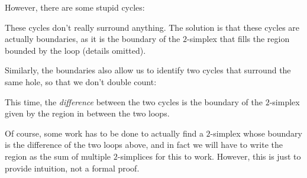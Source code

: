 \documentclass[a4paper]{article}
\begin{document}
\begin{eg}
  However, there are some stupid cycles:
  \begin{center}
  \end{center}
  These cycles don't really surround anything. The solution is that these cycles are actually boundaries, as it is the boundary of the $2$-simplex that fills the region bounded by the loop (details omitted).

  Similarly, the boundaries also allow us to identify two cycles that surround the same hole, so that we don't double count:
  \begin{center}
  \end{center}
  This time, the \emph{difference} between the two cycles is the boundary of the $2$-simplex given by the region in between the two loops.

  Of course, some work has to be done to actually find a $2$-simplex whose boundary is the difference of the two loops above, and in fact we will have to write the region as the sum of multiple $2$-simplices for this to work. However, this is just to provide intuition, not a formal proof.
\end{eg}
\end{document}
